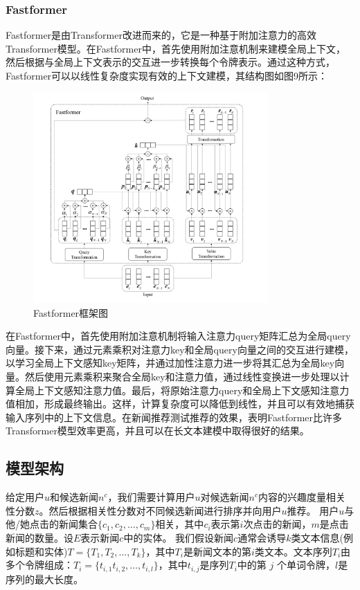 \documentclass[withoutpreface,bwprint]{cumcmthesis} %
\begin{document}
	\subsubsection{ Fastformer }
	Fastformer是由Transformer改进而来的，它是一种基于附加注意力的高效Transformer模型。在Fastformer中，首先使用附加注意机制来建模全局上下文，然后根据与全局上下文表示的交互进一步转换每个令牌表示。通过这种方式，Fastformer可以以线性复杂度实现有效的上下文建模，其结构图如图9所示：
	\begin{figure}[H]
		\centering
		\includegraphics[width=0.8\textwidth]{Fastformer}
		\caption{Fastformer框架图}
		\label{fig:circuit-diagcam}
	\end{figure}
	在Fastformer中，首先使用附加注意机制将输入注意力query矩阵汇总为全局query向量。接下来，通过元素乘积对注意力key和全局query向量之间的交互进行建模，以学习全局上下文感知key矩阵，并通过加性注意力进一步将其汇总为全局key向量。然后使用元素乘积来聚合全局key和注意力值，通过线性变换进一步处理以计算全局上下文感知注意力值。最后，将原始注意力query和全局上下文感知注意力值相加，形成最终输出。这样，计算复杂度可以降低到线性，并且可以有效地捕获输入序列中的上下文信息。在新闻推荐测试推荐的效果，表明Fastformer比许多Transformer模型效率更高，并且可以在长文本建模中取得很好的结果。
	\subsection{模型架构}
	给定用户$u$和候选新闻$n^c$，我们需要计算用户$u$对候选新闻$n^c$内容的兴趣度量相关性分数$z$。然后根据相关性分数对不同候选新闻进行排序并向用户$u$推荐。
	用户$u$与他/她点击的新闻集合$\{ c_1, c_2, \dots, c_m\} $相关，其中$c_i$表示第$i$次点击的新闻，$m$是点击新闻的数量。设$E$表示新闻$c$中的实体。
	我们假设新闻$c$通常会诱导$k$类文本信息(例如标题和实体)$T = \{ T_1, T_2,\dots, T_k\} $，其中$T_i$是新闻文本的第$i$类文本。文本序列$T_i$由多个令牌组成：$T_i = \{ t_{ i,1}  t_{ i,2}  ,\dots, t_{ i,l} \} $，其中$t_{ i,j} $是序列$T_i$中的第{ $j$} 个单词令牌，$l$是序列的最大长度。
\end{document}
